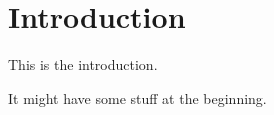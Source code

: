 \chapter{Introduction}

This is the introduction.

It might have some stuff at the beginning.

\lipsum[1-1]

% 
% 
